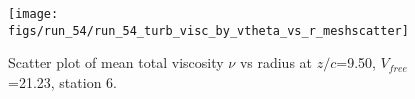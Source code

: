 \begin{figure}[H]
\centering
\texttt{[image: figs/run\_54/run\_54\_turb\_visc\_by\_vtheta\_vs\_r\_meshscatter]}
\caption{Scatter plot of mean total viscosity $\nu$ vs radius at $z/c$=9.50, $V_{free}$=21.23, station 6.}
\label{fig:run_54_turb_visc_by_vtheta_vs_r_meshscatter}
\end{figure}


